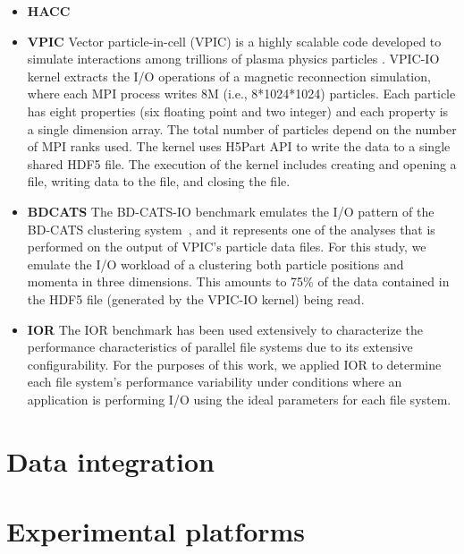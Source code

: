\begin{itemize}
\item \textbf{HACC} 
\item \textbf{VPIC}  
Vector particle-in-cell (VPIC) is a highly scalable code developed to simulate
interactions among trillions of plasma physics particles  \cite{Bowers2008}.
VPIC-IO kernel extracts the I/O operations of a magnetic reconnection
simulation, where each MPI process writes 8M (i.e., 8*1024*1024) particles. Each
particle has eight properties (six floating point and two integer) and each
property is a single dimension array. The total number of particles depend on
the number of MPI ranks used. The kernel uses H5Part API \cite{H5Part} to write
the data to a single shared HDF5 file. The execution of the kernel includes
creating and opening a file, writing data to the file, and closing the file.

\item \textbf{BDCATS}  The BD-CATS-IO benchmark emulates the I/O
pattern of the BD-CATS clustering system~\cite{Patwary2015}, and it represents
one of the analyses that is performed on the output of VPIC's particle data files.
For this study, we emulate the I/O workload of a clustering both particle
positions and momenta in three dimensions.  This amounts to 75\% of the data
contained in the HDF5 file (generated by the VPIC-IO kernel) being read.

\item \textbf{IOR}  The IOR benchmark has been used extensively
to characterize the performance characteristics of parallel file systems\cite{Yildiz2016,Xie2012,Lofstead2010,Uselton2010}
due to its extensive configurability.  For the purposes of this work, we applied
IOR to determine each file system's performance variability under conditions
where an application is performing I/O using the ideal parameters for each
file system.

\end{itemize}


\section{Data integration}


\section{Experimental platforms} \label{sec:platforms}

